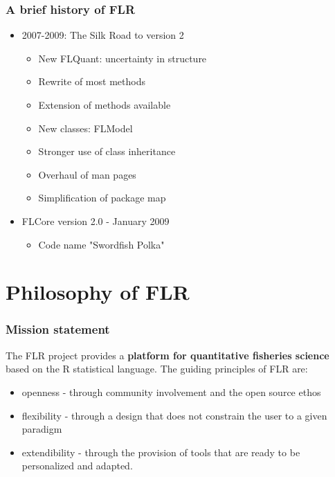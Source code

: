 \documentclass{beamer}%
\begin{document}
\begin{frame}
  \frametitle{A brief history of FLR}



  \begin{itemize}
	\item<1-> 2007-2009: The Silk Road to version 2
	\begin{itemize}
		\item<2-> New FLQuant: uncertainty in structure
		\item<2-> Rewrite of most methods
		\item<2-> Extension of methods available
		\item<2-> New classes: FLModel
		\item<2-> Stronger use of class inheritance
		\item<2-> Overhaul of man pages
		\item<2-> Simplification of package map
	\end{itemize}
  \end{itemize}
  \begin{itemize}
	\item<3-> FLCore version 2.0 - January 2009
	\begin{itemize}
		\item<3-> Code name "Swordfish Polka"
	\end{itemize}
   \end{itemize}
\end{frame}

\section{Philosophy of FLR}

\begin{frame} 
   \frametitle{Mission statement}

The FLR project provides a \textbf{platform for quantitative fisheries science} based on the R statistical language. The guiding principles of FLR are:
\begin{itemize}
	\item<2-> openness - through community involvement and the open source ethos
	\item<3-> flexibility - through a design that does not constrain the user to a given paradigm
	\item<4-> extendibility - through the provision of tools that are ready to be personalized and adapted.
\end{itemize}
\end{frame}
\end{document}
